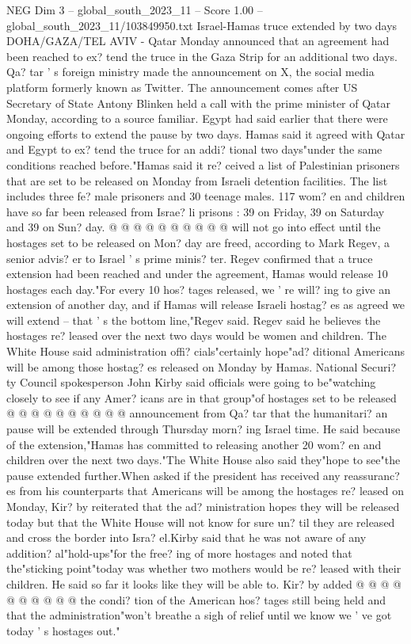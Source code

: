 \begin{textsample}{NEG Dim 3 – global\_south\_2023\_11 – Score 1.00 – global\_south\_2023\_11/103849950.txt}  \label{ex:f3_neg_090}
Israel-Hamas truce extended by two days DOHA/GAZA/TEL AVIV - Qatar Monday announced that an agreement had been reached to ex? tend the truce in the Gaza Strip for an additional two days.
Qa? tar ' s foreign ministry made the announcement on X, the social media platform formerly known as Twitter.
The announcement comes after US Secretary of State Antony Blinken held a call with the prime minister of Qatar Monday, according to a source familiar.
Egypt had said earlier that there were ongoing efforts to extend the pause by two days.
Hamas said it agreed with Qatar and Egypt to ex? tend the truce for an addi? tional two days"under the same conditions reached before."Hamas said it re? ceived a list of Palestinian prisoners that are set to be released on Monday from Israeli detention facilities.
The list includes three fe? male prisoners and 30 teenage males. 117 wom? en and children have so far been released from Israe? li prisons : 39 on Friday, 39 on Saturday and 39 on Sun? day. @ @ @ @ @ @ @ @ @ @ will not go into effect until the hostages set to be released on Mon? day are freed, according to Mark Regev, a senior advis? er to Israel ' s prime minis? ter.
Regev confirmed that a truce extension had been reached and under the agreement, Hamas would release 10 hostages each day."For every 10 hos? tages released, we ' re will? ing to give an extension of another day, and if Hamas will release Israeli hostag? es as agreed we will extend -- that ' s the bottom line,"Regev said.
Regev said he believes the hostages re? leased over the next two days would be women and children.
The White House said administration offi? cials"certainly hope"ad? ditional Americans will be among those hostag? es released on Monday by Hamas.
National Securi? ty Council spokesperson John Kirby said officials were going to be"watching closely to see if any Amer? icans are in that group"of hostages set to be released @ @ @ @ @ @ @ @ @ @ announcement from Qa? tar that the humanitari? an pause will be extended through Thursday morn? ing Israel time.
He said because of the extension,"Hamas has committed to releasing another 20 wom? en and children over the next two days."The White House also said they"hope to see"the pause extended further.When asked if the president has received any reassuranc? es from his counterparts that Americans will be among the hostages re? leased on Monday, Kir? by reiterated that the ad? ministration hopes they will be released today but that the White House will not know for sure un? til they are released and cross the border into Isra? el.Kirby said that he was not aware of any addition? al"hold-ups"for the free? ing of more hostages and noted that the"sticking point"today was whether two mothers would be re? leased with their children.
He said so far it looks like they will be able to.
Kir? by added @ @ @ @ @ @ @ @ @ @ the condi? tion of the American hos? tages still being held and that the administration"won't breathe a sigh of relief until we know we ' ve got today ' s hostages out."

\end{textsample}
